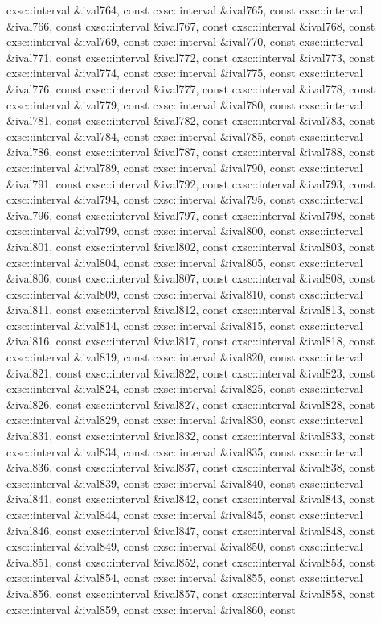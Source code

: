 \begin{DoxyCompactItemize}
cxsc\-::interval \&ival764, const cxsc\-::interval \&ival765, const cxsc\-::interval \&ival766, const cxsc\-::interval \&ival767, const cxsc\-::interval \&ival768, const cxsc\-::interval \&ival769, const cxsc\-::interval \&ival770, const cxsc\-::interval \&ival771, const cxsc\-::interval \&ival772, const cxsc\-::interval \&ival773, const cxsc\-::interval \&ival774, const cxsc\-::interval \&ival775, const cxsc\-::interval \&ival776, const cxsc\-::interval \&ival777, const cxsc\-::interval \&ival778, const cxsc\-::interval \&ival779, const cxsc\-::interval \&ival780, const cxsc\-::interval \&ival781, const cxsc\-::interval \&ival782, const cxsc\-::interval \&ival783, const cxsc\-::interval \&ival784, const cxsc\-::interval \&ival785, const cxsc\-::interval \&ival786, const cxsc\-::interval \&ival787, const cxsc\-::interval \&ival788, const cxsc\-::interval \&ival789, const cxsc\-::interval \&ival790, const cxsc\-::interval \&ival791, const cxsc\-::interval \&ival792, const cxsc\-::interval \&ival793, const cxsc\-::interval \&ival794, const cxsc\-::interval \&ival795, const cxsc\-::interval \&ival796, const cxsc\-::interval \&ival797, const cxsc\-::interval \&ival798, const cxsc\-::interval \&ival799, const cxsc\-::interval \&ival800, const cxsc\-::interval \&ival801, const cxsc\-::interval \&ival802, const cxsc\-::interval \&ival803, const cxsc\-::interval \&ival804, const cxsc\-::interval \&ival805, const cxsc\-::interval \&ival806, const cxsc\-::interval \&ival807, const cxsc\-::interval \&ival808, const cxsc\-::interval \&ival809, const cxsc\-::interval \&ival810, const cxsc\-::interval \&ival811, const cxsc\-::interval \&ival812, const cxsc\-::interval \&ival813, const cxsc\-::interval \&ival814, const cxsc\-::interval \&ival815, const cxsc\-::interval \&ival816, const cxsc\-::interval \&ival817, const cxsc\-::interval \&ival818, const cxsc\-::interval \&ival819, const cxsc\-::interval \&ival820, const cxsc\-::interval \&ival821, const cxsc\-::interval \&ival822, const cxsc\-::interval \&ival823, const cxsc\-::interval \&ival824, const cxsc\-::interval \&ival825, const cxsc\-::interval \&ival826, const cxsc\-::interval \&ival827, const cxsc\-::interval \&ival828, const cxsc\-::interval \&ival829, const cxsc\-::interval \&ival830, const cxsc\-::interval \&ival831, const cxsc\-::interval \&ival832, const cxsc\-::interval \&ival833, const cxsc\-::interval \&ival834, const cxsc\-::interval \&ival835, const cxsc\-::interval \&ival836, const cxsc\-::interval \&ival837, const cxsc\-::interval \&ival838, const cxsc\-::interval \&ival839, const cxsc\-::interval \&ival840, const cxsc\-::interval \&ival841, const cxsc\-::interval \&ival842, const cxsc\-::interval \&ival843, const cxsc\-::interval \&ival844, const cxsc\-::interval \&ival845, const cxsc\-::interval \&ival846, const cxsc\-::interval \&ival847, const cxsc\-::interval \&ival848, const cxsc\-::interval \&ival849, const cxsc\-::interval \&ival850, const cxsc\-::interval \&ival851, const cxsc\-::interval \&ival852, const cxsc\-::interval \&ival853, const cxsc\-::interval \&ival854, const cxsc\-::interval \&ival855, const cxsc\-::interval \&ival856, const cxsc\-::interval \&ival857, const cxsc\-::interval \&ival858, const cxsc\-::interval \&ival859, const cxsc\-::interval \&ival860, const 
\end{DoxyCompactItemize}
